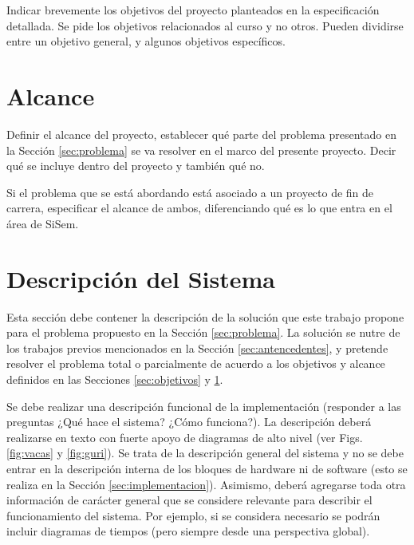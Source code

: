 \documentclass[a4paper,12pt]{article}
\begin{document}
\begin{linenumbers}
Indicar brevemente los objetivos del proyecto planteados en la especificación detallada. Se pide los objetivos relacionados al curso y no otros. Pueden dividirse entre un objetivo general, y algunos objetivos específicos.

\section{Alcance}
\label{sec:alcance}

Definir el alcance del proyecto, establecer qu\'e parte del problema presentado en la Sección \ref{sec:problema} se va resolver en el marco del presente proyecto. Decir qué se incluye dentro del proyecto y también qu\'e no. 

Si el problema que se está abordando está asociado a un proyecto de fin de carrera, especificar  el alcance de ambos, diferenciando qué es lo que entra en el \'area de SiSem. 


\section{Descripci\'on del Sistema}
\label{sec:sistema}

Esta sección debe contener la descripción de la solución que este trabajo propone para el problema propuesto en la Sección \ref{sec:problema}. La solución se nutre de los trabajos previos mencionados en la Sección \ref{sec:antencedentes}, y pretende resolver el problema total o parcialmente de acuerdo a los objetivos y alcance definidos en las Secciones \ref{sec:objetivos} y \ref{sec:alcance}.

Se debe realizar una descripción funcional de la implementaci\'on (responder a las preguntas ¿Qué hace el sistema? ¿Cómo funciona?). La descripción deberá realizarse en texto con fuerte apoyo de diagramas de alto nivel (ver Figs. \ref{fig:vacas} y \ref{fig:guri}). Se trata de la descripci\'on general del sistema y no se debe entrar en la descripci\'on interna de los bloques de hardware ni de software (esto se realiza en la Secci\'on \ref{sec:implementacion}). Asimismo, deberá agregarse toda otra informaci\'on de carácter general que se considere relevante para describir el funcionamiento del sistema. Por ejemplo, si se considera necesario se podrán incluir diagramas de tiempos (pero siempre desde una perspectiva global).



\end{linenumbers}
\end{document}
